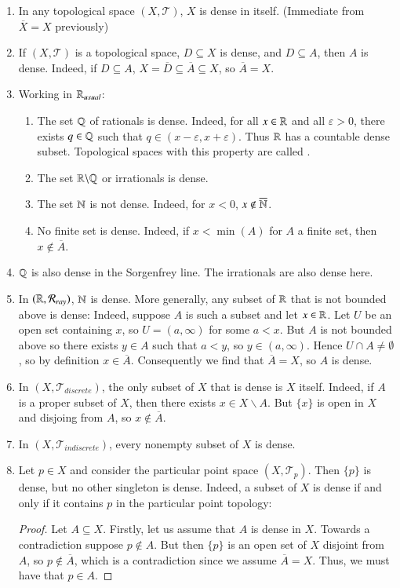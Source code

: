 \documentclass[12pt, a4paper, oneside, openright, titlepage]{book}
\begin{document}
\begin{example}
    \leavevmode
    \begin{enumerate}
        \item In any topological space $(X,\mathcal{T})$, $X$ is dense in itself. (Immediate from $\overline{X} = X$ previously)
        \item If $(X,\mathcal{T})$ is a topological space, $D\subseteq X$ is dense, and $D \subseteq A$, then $A$ is dense. Indeed, if $D \subseteq A$, $X = \overline{D} \subseteq \overline{A} \subseteq X$, so $\overline{A} = X$.
        \item Working in $\mathbb R_{usual}$: \begin{enumerate}
                \item The set $\mathbb Q$ of rationals is dense. Indeed, for all $x \in \mathbb R$ and all $\varepsilon > 0$, there exists $q \in \mathbb Q$ such that $q \in (x-\varepsilon,x+\varepsilon)$. Thus $\mathbb R$ has a countable dense subset. Topological spaces with this property are called .
                \item The set $\mathbb R\backslash \mathbb Q$ or irrationals is dense.
                \item The set $\mathbb N$ is not dense. Indeed, for $x < 0$, $x \notin \overline{\mathbb N}$.
                \item No finite set is dense. Indeed, if $x < \min(A)$ for $A$ a finite set, then $x \notin \overline{A}$.
        \end{enumerate}
        \item $\mathbb Q$ is also dense in the Sorgenfrey line. The irrationals are also dense here.
        \item In $(\mathbb R,\mathcal{R}_{ray})$, $\mathbb N$ is dense. More generally, any subset of $\mathbb R$ that is not bounded above is dense: Indeed, suppose $A$ is such a subset and let $x \in \mathbb R$. Let $U$ be an open set containing $x$, so $U = (a,\infty)$ for some $a < x$. But $A$ is not bounded above so there exists $y \in A$ such that $a < y$, so $y \in (a,\infty)$. Hence $U\cap A \neq \emptyset$, so by definition $x \in \overline{A}$. Consequently we find that $\overline{A} = X$, so $A$ is dense.
        \item In $(X,\mathcal{T}_{discrete})$, the only subset of $X$ that is dense is $X$ itself. Indeed, if $A$ is a proper subset of $X$, then there exists $x \in X\backslash A$. But $\{x\}$ is open in $X$ and disjoing from $A$, so $x \notin \overline{A}$.
        \item In $(X,\mathcal{T}_{indiscrete})$, every nonempty subset of $X$ is dense.
        \item Let $p \in X$ and consider the particular point space $(X,\mathcal{T}_p)$. Then $\{p\}$ is dense, but no other singleton is dense. Indeed, a subset of $X$ is dense if and only if it contains $p$ in the particular point topology: \begin{proof}
                Let $A \subseteq X$. Firstly, let us assume that $A$ is dense in $X$. Towards a contradiction suppose $p \notin A$. But then $\{p\}$ is an open set of $X$ disjoint from $A$, so $p \notin \overline{A}$, which is a contradiction since we assume $\overline{A} = X$. Thus, we must have that $p \in A$.



\end{proof}
\end{enumerate}
\end{example}
\end{document}
